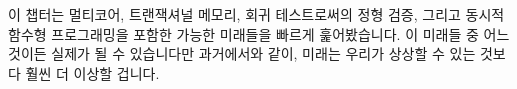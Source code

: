 이 챕터는 멀티코어, 트랜잭셔널 메모리, 회귀 테스트로써의 정형 검증, 그리고
동시적 함수형 프로그래밍을 포함한 가능한 미래들을 빠르게 훑어봤습니다.
이 미래들 중 어느 것이든 실제가 될 수 있습니다만 과거에서와 같이, 미래는 우리가
상상할 수 있는 것보다 훨씬 더 이상할 겁니다.

\iffalse

This chapter has taken a quick tour of a number of possible futures,
including multicore, transactional memory, formal verification as
a regression test, and concurrent functional programming.
Any of these futures might come true, but it is more likely that, as in
the past, the future will be far stranger than we can possibly imagine.

\fi

